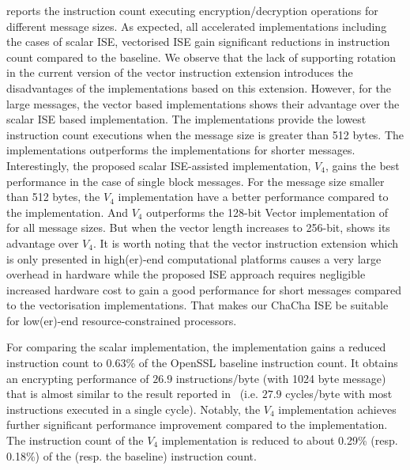  reports the instruction count executing encryption/decryption operations for different message sizes. 
As expected, all accelerated implementations including the cases of scalar ISE, vectorised ISE gain significant reductions in instruction count compared to the baseline. 
We observe that the lack of supporting rotation in the current version of the vector instruction extension introduces the disadvantages of the implementations based on this extension. 
However, for the large messages, the vector based implementations shows their advantage over the scalar ISE based implementation. 
The  implementations provide the lowest instruction count executions when the message size is greater than 512 bytes. 
The  implementations outperforms the  implementations for shorter messages.
Interestingly, the proposed scalar ISE-assisted implementation, $V_4$, gains the best performance in the case of single block messages.
For the message size smaller than 512 bytes, the $V_4$ implementation have a better performance compared to the  implementation. 
And $V_4$ outperforms the 128-bit Vector implementation of  for all message sizes. But when the vector length increases to 256-bit,  shows its advantage over $V_4$. It is worth noting that the vector instruction extension which is only presented in high(er)-end computational platforms causes a very large overhead in hardware while the proposed ISE approach requires negligible increased hardware cost to gain a good performance for short messages compared to the vectorisation implementations. That makes our ChaCha ISE be suitable for low(er)-end resource-constrained processors.

For comparing the scalar implementation, the  implementation gains a reduced instruction count to 0.63\% of the OpenSSL baseline instruction count.
It obtains an encrypting performance of $26.9$ instructions/byte (with 1024 byte message) that is almost similar to the result reported in~\cite{Sto:19} (i.e. $27.9$ cycles/byte with most instructions executed in a single cycle). 
Notably, the $V_4$ implementation achieves further significant performance improvement compared to the  implementation. 
The instruction count of the $V_4$ implementation is reduced to about 0.29\% (resp. 0.18\%) of the  (resp. the baseline) instruction count.


